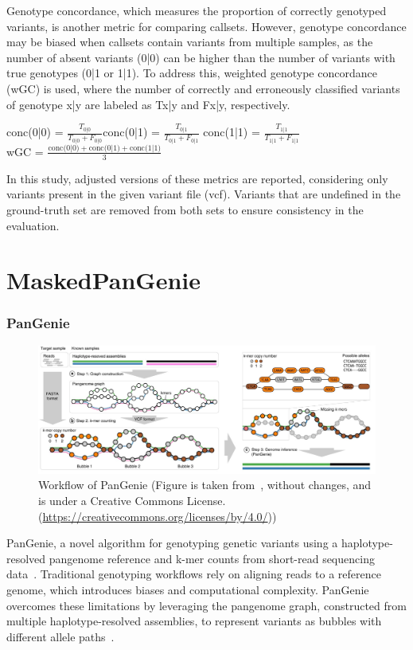 \documentclass{PHlab-thesis}
\begin{document}
Genotype concordance, which measures the proportion of correctly genotyped variants, is another metric for comparing callsets. However, genotype concordance may be biased when callsets contain variants from multiple samples, as the number of absent variants (0|0) can be higher than the number of variants with true genotypes (0|1 or 1|1). To address this, weighted genotype concordance (wGC) is used, where the number of correctly and erroneously classified variants of genotype x|y are labeled as Tx|y and Fx|y, respectively.
\begin{center}
    conc(0|0) = $\frac{T_{0|0}}{T_{0|0} + F_{0|0}}$\hspace{0.5cm}conc(0|1) = $\frac{T_{0|1}}{T_{0|1} + F_{0|1}}$\hspace{0.5cm} conc(1|1) = $\frac{T_{1|1}}{T_{1|1} + F_{1|1}}$\\
    \vspace{1cm}
    wGC = $\frac{\text{conc(0|0)} + \text{conc(0|1)} + \text{conc(1|1)}}{3}$
\end{center}

In this study, adjusted versions of these metrics are reported, considering only variants present in the given variant file (vcf). Variants that are undefined in the ground-truth set are removed from both sets to ensure consistency in the evaluation.
\section{MaskedPanGenie}
\subsubsection{PanGenie}
\begin{figure}
	\centering
	\includegraphics[scale=0.4]{figures/workflow of PanGenie.jpg}
	\caption{Workflow of PanGenie (Figure is taken from~\cite{1}, without changes, and is under a Creative Commons License.(\url{https://creativecommons.org/licenses/by/4.0/}))}
	\label{fig:PanGenie} %
\end{figure}
PanGenie, a novel algorithm for genotyping genetic variants using a haplotype-resolved pangenome reference and k-mer counts from short-read sequencing data~\cite{elber2022PanGenie}. Traditional genotyping workflows rely on aligning reads to a reference genome, which introduces biases and computational complexity. PanGenie overcomes these limitations by leveraging the pangenome graph, constructed from multiple haplotype-resolved assemblies, to represent variants as bubbles with different allele paths~\cite{elber2022PanGenie}.
\end{document}

